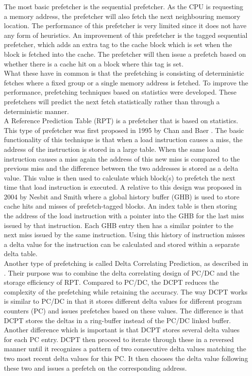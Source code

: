 The most basic prefetcher is the sequential prefetcher. As the CPU is requesting a memory address, the prefetcher will also fetch the next neighbouring memory location. The performance of this prefetcher is very limited since it does not have any form of heuristics. An improvement of this prefetcher is the tagged sequential prefetcher, which adds an extra tag to the cache block which is set when the block is fetched into the cache. The prefetcher will then issue a prefetch based on whether there is a cache hit on a block where this tag is set.\\
What these have in common is that the prefetching is consisting of deterministic fetches where a fixed group or a single memory address is fetched. To improve the performance, prefetching techniques based on statistics were developed. These prefetchers will predict the next fetch statistically rather than through a deterministic manner.\\
A Reference Prediction Table (RPT) is a prefetcher that is based on statistics. This type of prefetcher was first proposed in 1995 by Chan and Baer \cite{reference:chen}. The basic functionality of this technique is that when a load instruction causes a miss, the address of the instruction is stored in a large table. When the same load instruction causes a miss again the address of this new miss is compared to the previous miss and the difference between the two addresses is stored as a delta value. This value is then used to calculate which block(s) to prefetch the next time that load instruction is executed. 
A relative to this design was proposed in 2004 by Nesbit and Smith \cite{reference:nesbit} where a global history buffer (GHB) is used to store cache hits and misses of prefetch-tagged blocks. An index table is then storing the address of the load instruction with a pointer into the GHB for the last miss issued by that instruction. Each GHB entry then has a similar pointer to the next miss issued by the same instruction. Using this history of instruction misses a delta value for the instruction can be calculated and stored within  a separate delta table.\\
Another type of prefetching is called Delta Correlating Prediction, as described in \cite{reference:jahre}. Their purpose was to combine the delta correlating design of PC/DC and the storage efficiency of RPT. Compared to PC/DC, the DCPT reduces the complexity of the prefetching while retaining the accuracy.
The way DCPT works is similar to PC/DC in that it stores different delta values for different program counters (PC) and issues prefetches based on these values. The difference is that DCPT stores the deltas in a ring-buffer instead of the PC/DC linked buffer. Another difference which is important is that DCPT stores several delta values for each PC entry. DCPT then proceed to iterate through these in a reversed manner until it recognizes a pattern of two consecutive delta values matching the two most recent delta values for this PC. It then chooses the delta value following these two and issues a prefetch on the corresponding address.
